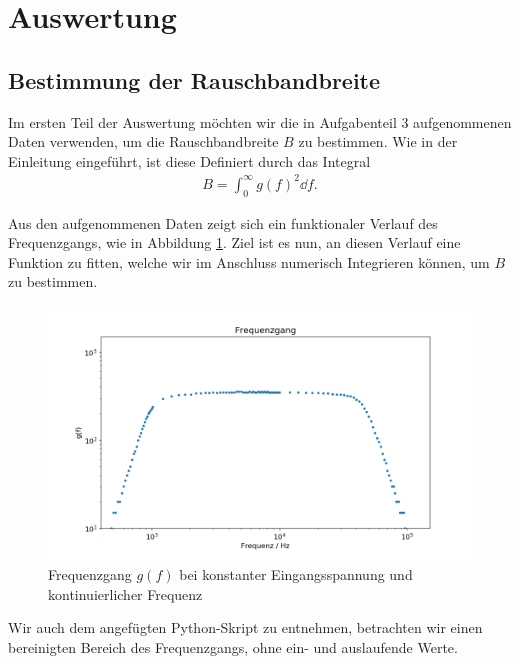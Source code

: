 \section{Auswertung}

\subsection{Bestimmung der Rauschbandbreite}

Im ersten Teil der Auswertung möchten wir die in Aufgabenteil 3 aufgenommenen Daten verwenden, um die Rauschbandbreite $B$ zu bestimmen. Wie in der Einleitung eingeführt, ist diese Definiert durch das Integral
\begin{align}
  B = \int_0^{\infty} g(f)^2 \dd{f}.
\end{align}

Aus den aufgenommenen Daten zeigt sich ein funktionaler Verlauf des Frequenzgangs, wie in Abbildung \ref{plot:frequenzgang}. Ziel ist es nun, an diesen Verlauf eine Funktion zu fitten, welche wir im Anschluss numerisch Integrieren können, um $B$ zu bestimmen.
\begin{figure}[H]
  \centering
  \includegraphics[width=.8\textwidth]{files/freq_data.png}
  \caption{Frequenzgang $g(f)$ bei konstanter Eingangsspannung und kontinuierlicher Frequenz}
  \label{plot:frequenzgang}
\end{figure}

Wir auch dem angefügten Python-Skript zu entnehmen, betrachten wir einen bereinigten Bereich des Frequenzgangs, ohne ein- und auslaufende Werte. 

